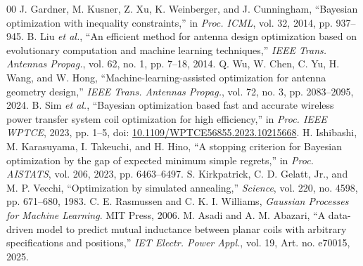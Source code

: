 \documentclass[10pt,conference,letterpaper]{IEEEtran}
\begin{document}
\begin{thebibliography}{00}
 J. Gardner, M. Kusner, Z. Xu, K. Weinberger, and J. Cunningham, ``Bayesian optimization with inequality constraints,'' in \emph{Proc. ICML}, vol. 32, 2014, pp. 937--945.
 B. Liu \emph{et al.}, ``An efficient method for antenna design optimization based on evolutionary computation and machine learning techniques,'' \emph{IEEE Trans. Antennas Propag.}, vol. 62, no. 1, pp. 7--18, 2014.
 Q. Wu, W. Chen, C. Yu, H. Wang, and W. Hong, ``Machine-learning-assisted optimization for antenna geometry design,'' \emph{IEEE Trans. Antennas Propag.}, vol. 72, no. 3, pp. 2083--2095, 2024.
 B. Sim \emph{et al.}, ``Bayesian optimization based fast and accurate wireless power transfer system coil optimization for high efficiency,'' in \emph{Proc. IEEE WPTCE}, 2023, pp. 1--5, doi: \url{10.1109/WPTCE56855.2023.10215668}.
 H. Ishibashi, M. Karasuyama, I. Takeuchi, and H. Hino, ``A stopping criterion for Bayesian optimization by the gap of expected minimum simple regrets,'' in \emph{Proc. AISTATS}, vol. 206, 2023, pp. 6463--6497.
 S. Kirkpatrick, C. D. Gelatt, Jr., and M. P. Vecchi, ``Optimization by simulated annealing,'' \emph{Science}, vol. 220, no. 4598, pp. 671--680, 1983.
 C. E. Rasmussen and C. K. I. Williams, \emph{Gaussian Processes for Machine Learning}. MIT Press, 2006.
 M. Asadi and A. M. Abazari, ``A data-driven model to predict mutual inductance between planar coils with arbitrary specifications and positions,'' \emph{IET Electr. Power Appl.}, vol. 19, Art. no. e70015, 2025.
\end{thebibliography}
\end{document}
